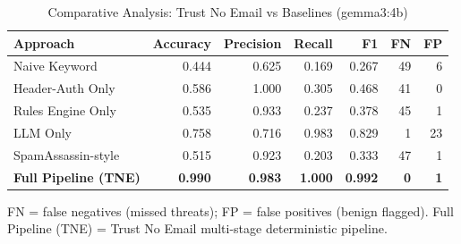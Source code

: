 \begin{table}[h]
\centering
\caption{Comparative Analysis: Trust No Email vs Baselines (gemma3:4b)}
\label{tab:e10_comparative}
\begin{tabular}{l r r r r r r}
\hline
Approach & Accuracy & Precision & Recall & F1 & FN & FP \\
\hline
Naive Keyword & 0.444 & 0.625 & 0.169 & 0.267 & 49 & 6 \\
Header-Auth Only & 0.586 & 1.000 & 0.305 & 0.468 & 41 & 0 \\
Rules Engine Only & 0.535 & 0.933 & 0.237 & 0.378 & 45 & 1 \\
LLM Only & 0.758 & 0.716 & 0.983 & 0.829 & 1 & 23 \\
SpamAssassin-style & 0.515 & 0.923 & 0.203 & 0.333 & 47 & 1 \\
\textbf{Full Pipeline (TNE)} & \textbf{0.990} & \textbf{0.983} & \textbf{1.000} & \textbf{0.992} & \textbf{0} & \textbf{1} \\
\hline
\end{tabular}
\vspace{2mm}
\footnotesize{FN = false negatives (missed threats); FP = false positives (benign flagged). Full Pipeline (TNE) = Trust No Email multi-stage deterministic pipeline.}
\end{table}